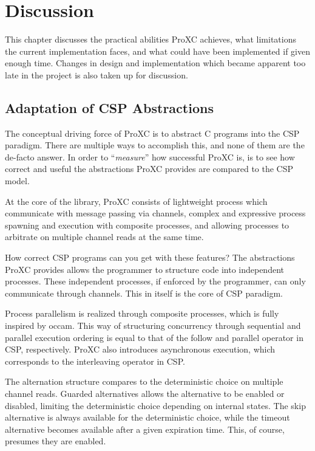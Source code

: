 
\chapter{Discussion}
\label{ch:discussion}

This chapter discusses the practical abilities ProXC achieves, what limitations the current implementation faces, and what could have been implemented if given enough time. Changes in design and implementation which became apparent too late in the project is also taken up for discussion. 

\section{Adaptation of CSP Abstractions}

The conceptual driving force of ProXC is to abstract C programs into the CSP paradigm. There are multiple ways to accomplish this, and none of them are the de\hyp{}facto answer. In order to ``\textit{measure}'' how successful ProXC is, is to see how correct and useful the abstractions ProXC provides are compared to the CSP model. 

At the core of the library, ProXC consists of lightweight process which communicate with message passing via channels, complex and expressive process spawning and execution with composite processes, and allowing processes to arbitrate on multiple channel reads at the same time. 

How correct CSP programs can you get with these features? The abstractions ProXC provides allows the programmer to structure code into independent processes. These independent processes, if enforced by the programmer, can only communicate through channels. This in itself is the core of CSP paradigm. 

Process parallelism is realized through composite processes, which is fully inspired by occam. This way of structuring concurrency through sequential and parallel execution ordering is equal to that of the follow and parallel operator in CSP, respectively. ProXC also introduces asynchronous execution, which corresponds to the interleaving operator in CSP. 

The alternation structure compares to the deterministic choice on multiple channel reads. Guarded alternatives allows the alternative to be enabled or disabled, limiting the deter\-mi\-nistic choice depending on internal states. The skip alternative is always available for the deter\-mi\-nistic choice, while the timeout alternative becomes available after a given expiration time. This, of course, presumes they are enabled. 

